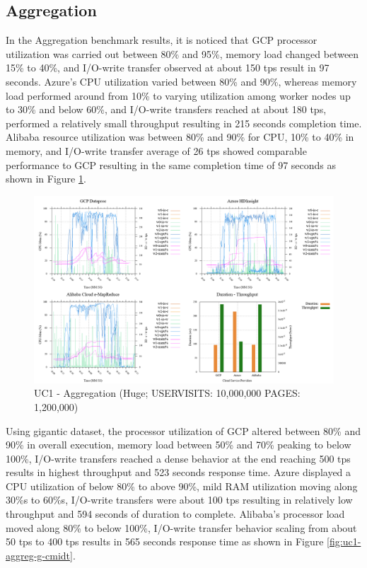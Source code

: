 \documentclass[review]{elsarticle}
\begin{document}
\subsection{Aggregation}
In the Aggregation benchmark results, it is noticed that GCP processor utilization was carried out between 80\% and 95\%, memory load changed between 15\% to 40\%, and I/O-write transfer observed at about 150 tps result in 97 seconds. Azure's CPU utilization varied between 80\% and 90\%, whereas memory load performed around from 10\% to varying utilization among worker nodes up to 30\% and below 60\%, and I/O-write transfers reached at about 180 tps, performed a relatively small throughput resulting in 215 seconds completion time. Alibaba resource utilization was between 80\% and 90\% for CPU, 10\% to 40\% in memory, and I/O-write transfer average of 26 tps showed comparable performance to GCP resulting in the same completion time of 97 seconds as shown in Figure \ref{fig:uc1-aggreg-h-cmidt}.
 
\begin{figure}[p]
	\caption{UC1 - Aggregation (Huge; USERVISITS: 10,000,000 PAGES: 1,200,000)}
	\label{fig:uc1-aggreg-h-cmidt}
	\includegraphics[width=\textwidth]{uc1-aggreg-h-cmidt}
	\centering
\end{figure}

Using gigantic dataset, the processor utilization of GCP altered between 80\% and 90\% in overall execution, memory load between 50\% and 70\% peaking to below 100\%, I/O-write transfers reached a dense behavior at the end reaching 500 tps results in highest throughput and 523 seconds response time. Azure displayed a CPU utilization of below 80\% to above 90\%, mild RAM utilization moving along 30\%s to 60\%s, I/O-write transfers were about 100 tps resulting in relatively low throughput and 594 seconds of duration to complete. Alibaba's processor load moved along 80\% to below 100\%, I/O-write transfer behavior scaling from about 50 tps to 400 tps results in 565 seconds response time as shown in Figure \ref{fig:uc1-aggreg-g-cmidt}.
\end{document}
